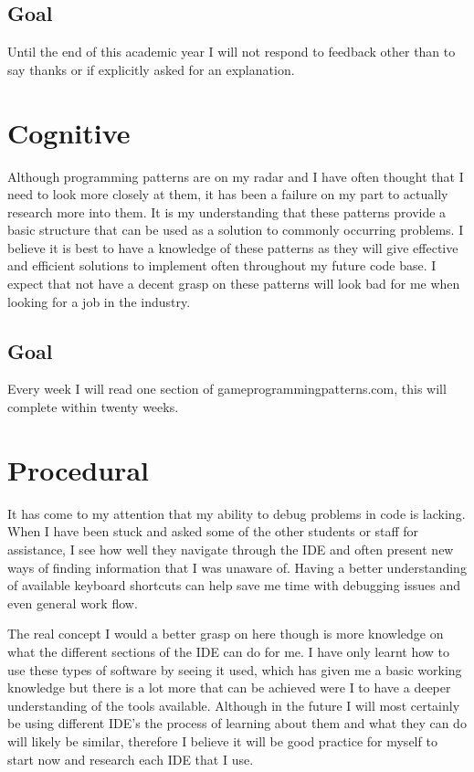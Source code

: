 \documentclass{scrartcl}
\begin{document}
\subsection{Goal}
Until the end of this academic year I will not respond to feedback other than to say thanks or if explicitly asked for an explanation.

\section{Cognitive}
Although programming patterns are on my radar and I have often thought that I need to look more closely at them, it has been a failure on my part to actually research more into them. It is my understanding that these patterns provide a basic structure that can be used as a solution to commonly occurring problems. I believe it is best to have a knowledge of these patterns as they will give effective and efficient solutions to implement often throughout my future code base. I expect that not have a decent grasp on these patterns will look bad for me when looking for a job in the industry.
\subsection{Goal}
Every week I will read one section of gameprogrammingpatterns.com, this will complete within twenty weeks.

\section{Procedural}
It has come to my attention that my ability to debug problems in code is lacking. When I have been stuck and asked some of the other students or staff for assistance, I see how well they navigate through the IDE and often present new ways of finding information that I was unaware of. Having a better understanding of available keyboard shortcuts can help save me time with debugging issues and even general work flow. 

The real concept I would a better grasp on here though is more knowledge on what the different sections of the IDE can do for me. I have only learnt how to use these types of software by seeing it used, which has given me a basic working knowledge but there is a lot more that can be achieved were I to have a deeper understanding of the tools available. Although in the future I will most certainly be using different IDE's the process of learning about them and what they can do will likely be similar, therefore I believe it will be good practice for myself to start now and research each IDE that I use.
\end{document}
